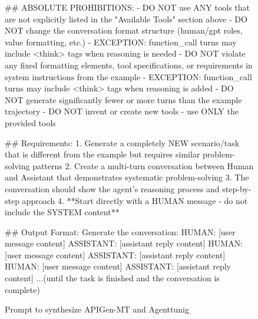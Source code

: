 \begin{figure}[htbp]
\begin{tcolorbox}[title=Prompt to synthesize APIGen-MT and Agenttunig]
\begin{tcblisting}
## ABSOLUTE PROHIBITIONS:
- DO NOT use ANY tools that are not explicitly listed in the "Available Tools" section above
- DO NOT change the conversation format structure (human/gpt roles, value formatting, etc.) - EXCEPTION: function_call turns may include <think> tags when reasoning is needed
- DO NOT violate any fixed formatting elements, tool specifications, or requirements in system instructions from the example - EXCEPTION: function_call turns may include <think> tags when reasoning is added
- DO NOT generate significantly fewer or more turns than the example trajectory
- DO NOT invent or create new tools - use ONLY the provided tools

## Requirements:
1. Generate a completely NEW scenario/task that is different from the example but requires similar problem-solving patterns
2. Create a multi-turn conversation between Human and Assistant that demonstrates systematic problem-solving
3. The conversation should show the agent's reasoning process and step-by-step approach
4. **Start directly with a HUMAN message - do not include the SYSTEM content**

## Output Format:
Generate the conversation:
HUMAN: [user message content]
ASSISTANT: [assistant reply content]
HUMAN: [user message content]
ASSISTANT: [assistant reply content]
HUMAN: [user message content]
ASSISTANT: [assistant reply content]
...(until the task is finished and the conversation is complete)
\end{tcblisting}
\end{tcolorbox}
\caption{Prompt to synthesize APIGen-MT and Agenttunig}
\label{fig:Prompt to synthesize APIGen-MT}
\end{figure}




